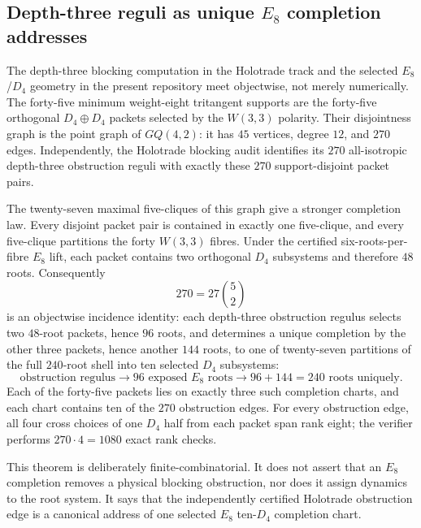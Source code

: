 \subsection{Depth-three reguli as unique $E_8$ completion addresses}
\label{sec:20260901-regulus-e8-completion}

The depth-three blocking computation in the Holotrade track and the selected
$E_8$/$D_4$ geometry in the present repository meet objectwise, not merely
numerically.  The forty-five minimum weight-eight tritangent supports are the
forty-five orthogonal $D_4\oplus D_4$ packets selected by the $W(3,3)$
polarity.  Their disjointness graph is the point graph of $GQ(4,2)$: it has
$45$ vertices, degree $12$, and $270$ edges.  Independently, the Holotrade
blocking audit identifies its $270$ all-isotropic depth-three obstruction
reguli with exactly these $270$ support-disjoint packet pairs.

The twenty-seven maximal five-cliques of this graph give a stronger completion
law.  Every disjoint packet pair is contained in exactly one five-clique, and
every five-clique partitions the forty $W(3,3)$ fibres.  Under the certified
six-roots-per-fibre $E_8$ lift, each packet contains two orthogonal $D_4$
subsystems and therefore $48$ roots.  Consequently
\[
  \boxed{270=27\binom{5}{2}}
\]
is an objectwise incidence identity: each depth-three obstruction regulus
selects two $48$-root packets, hence $96$ roots, and determines a unique
completion by the other three packets, hence another $144$ roots, to one of
twenty-seven partitions of the full $240$-root shell into ten selected
$D_4$ subsystems:
\[
  \boxed{
  \text{obstruction regulus}
  \longrightarrow
  96\text{ exposed }E_8\text{ roots}
  \longrightarrow
  96+144=240\text{ roots uniquely}.
  }
\]
Each of the forty-five packets lies on exactly three such completion charts,
and each chart contains ten of the $270$ obstruction edges.  For every
obstruction edge, all four cross choices of one $D_4$ half from each packet
span rank eight; the verifier performs $270\cdot4=1080$ exact rank checks.

This theorem is deliberately finite-combinatorial.  It does not assert that an
$E_8$ completion removes a physical blocking obstruction, nor does it assign
dynamics to the root system.  It says that the independently certified
Holotrade obstruction edge is a canonical address of one selected $E_8$
ten-$D_4$ completion chart.

